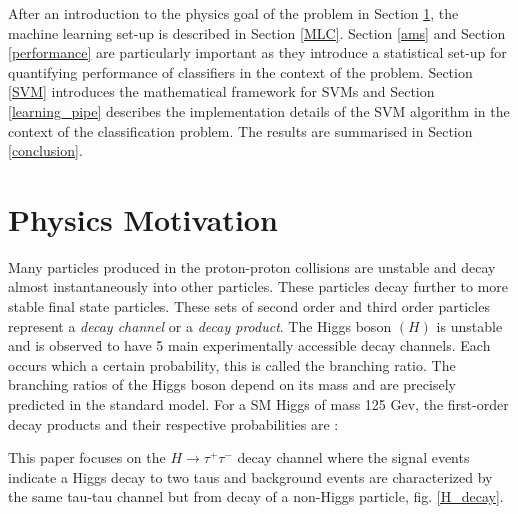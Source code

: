 \documentclass[final,3p,times,twocolumn]{elsarticle}
\begin{document}
After an introduction to the physics goal of the problem in Section \ref{physics}, the machine learning set-up is described in Section \ref{MLC}. Section \ref{ams} and Section \ref{performance} are particularly important as they introduce a  statistical set-up for quantifying performance of classifiers in the context of the problem. Section \ref{SVM} introduces the mathematical framework for SVMs and Section \ref{learning_pipe} describes the implementation details of the SVM algorithm in the context of the classification problem. The results are  summarised in Section \ref{conclusion}.

\section{Physics Motivation}
\label{physics}
Many particles produced in the proton-proton collisions are unstable and decay almost instantaneously into other particles. These particles decay further to more stable final state particles. These sets of second order and third order particles represent a \textit{decay channel} or a \textit{decay product}. The Higgs boson $(H)$ is unstable and is observed to have 5 main experimentally accessible decay channels. Each occurs which a certain probability, this is called the branching ratio. The branching ratios of the Higgs boson depend on its mass and are precisely predicted in the standard model. For a SM Higgs of mass 125 Gev, the first-order decay products and their respective probabilities are : 


This paper focuses on the  $H \rightarrow \tau^{+} \tau^{-}$ decay channel where the signal events indicate a Higgs decay to two taus and background events are characterized by the same tau-tau channel but from decay of a non-Higgs particle, fig. \ref{H_decay}.  
 
\end{document}
